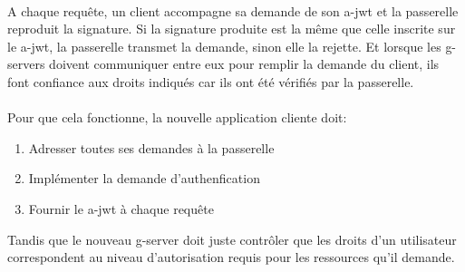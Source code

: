\paragraph{}
A chaque requête, un client accompagne sa demande de son \gls{a-jwt} et la passerelle reproduit la signature.
Si la signature produite est la même que celle inscrite sur le \gls{a-jwt}, la passerelle transmet la demande, sinon elle la rejette.
Et lorsque les \glspl{g-server} doivent communiquer entre eux pour remplir la demande du client, ils font confiance aux droits indiqués car ils ont été vérifiés par la passerelle.

\paragraph{}
Pour que cela fonctionne, la nouvelle application cliente doit:
\begin{enumerate}
    \item Adresser toutes ses demandes à la passerelle
    \item Implémenter la demande d'authenfication
    \item Fournir le \gls{a-jwt} à chaque requête
\end{enumerate}
Tandis que le nouveau \gls{g-server} doit juste contrôler que les droits d'un utilisateur correspondent au niveau d'autorisation requis pour les ressources qu'il demande.
